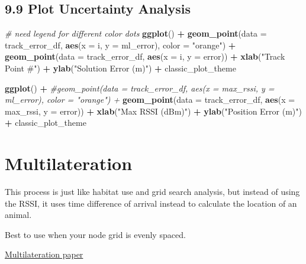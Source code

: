 \documentclass[
]{book}
\newenvironment{Shaded}{\begin{snugshade}}{\end{snugshade}}
\newcommand{\AttributeTok}[1]{\textcolor[rgb]{0.13,0.29,0.53}{#1}}
\newcommand{\CommentTok}[1]{\textcolor[rgb]{0.56,0.35,0.01}{\textit{#1}}}
\newcommand{\FunctionTok}[1]{\textcolor[rgb]{0.13,0.29,0.53}{\textbf{#1}}}
\newcommand{\NormalTok}[1]{#1}
\newcommand{\SpecialCharTok}[1]{\textcolor[rgb]{0.81,0.36,0.00}{\textbf{#1}}}
\newcommand{\StringTok}[1]{\textcolor[rgb]{0.31,0.60,0.02}{#1}}
\begin{document}
\section{9.9 Plot Uncertainty Analysis}\label{plot-uncertainty-analysis}

\begin{Shaded}
\begin{Highlighting}[]
\CommentTok{\# need legend for different color dots}
\FunctionTok{ggplot}\NormalTok{() }\SpecialCharTok{+}
  \FunctionTok{geom\_point}\NormalTok{(}\AttributeTok{data =}\NormalTok{ track\_error\_df, }\FunctionTok{aes}\NormalTok{(}\AttributeTok{x =}\NormalTok{ i, }\AttributeTok{y =}\NormalTok{ ml\_error), }\AttributeTok{color =} \StringTok{"orange"}\NormalTok{) }\SpecialCharTok{+}
  \FunctionTok{geom\_point}\NormalTok{(}\AttributeTok{data =}\NormalTok{ track\_error\_df, }\FunctionTok{aes}\NormalTok{(}\AttributeTok{x =}\NormalTok{ i, }\AttributeTok{y =}\NormalTok{ error)) }\SpecialCharTok{+}
  \FunctionTok{xlab}\NormalTok{(}\StringTok{"Track Point \#"}\NormalTok{) }\SpecialCharTok{+}
  \FunctionTok{ylab}\NormalTok{(}\StringTok{"Solution Error (m)"}\NormalTok{) }\SpecialCharTok{+}
\NormalTok{  classic\_plot\_theme}

\FunctionTok{ggplot}\NormalTok{() }\SpecialCharTok{+}
  \CommentTok{\#geom\_point(data = track\_error\_df, aes(x = max\_rssi, y = ml\_error), color = "orange") +}
  \FunctionTok{geom\_point}\NormalTok{(}\AttributeTok{data =}\NormalTok{ track\_error\_df, }\FunctionTok{aes}\NormalTok{(}\AttributeTok{x =}\NormalTok{ max\_rssi, }\AttributeTok{y =}\NormalTok{ error)) }\SpecialCharTok{+}
  \FunctionTok{xlab}\NormalTok{(}\StringTok{"Max RSSI (dBm)"}\NormalTok{) }\SpecialCharTok{+}
  \FunctionTok{ylab}\NormalTok{(}\StringTok{"Position Error (m)"}\NormalTok{) }\SpecialCharTok{+}
\NormalTok{  classic\_plot\_theme}
\end{Highlighting}
\end{Shaded}

\chapter{Multilateration}\label{multilateration}

This process is just like habitat use and grid search analysis, but instead of using the RSSI, it uses time difference of arrival instead to calculate the location of an animal.

Best to use when your node grid is evenly spaced.

\href{https://pubmed.ncbi.nlm.nih.gov/35169450/}{Multilateration paper}
\end{document}
